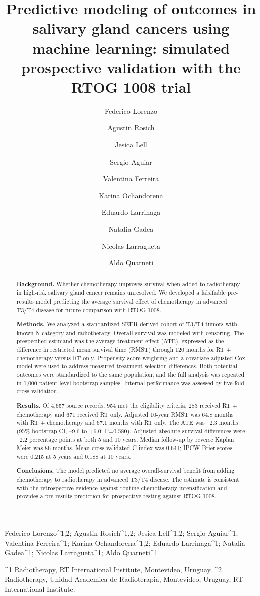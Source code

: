 \documentclass[10pt,twocolumn]{article}
\title{Predictive modeling of outcomes in salivary gland cancers using machine learning: simulated prospective validation with the RTOG 1008 trial}
\author{Federico Lorenzo \and Agustin Rosich \and Jesica Lell \and Sergio Aguiar \and Valentina Ferreira \and Karina Ochandorena \and Eduardo Larrinaga \and Natalia Gadea \and Nicolas Larragueta \and Aldo Quarneti}
\date{}
\begin{document}
\maketitle
Federico Lorenzo\textasciicircum{}1,2; Agustin Rosich\textasciicircum{}1,2; Jesica Lell\textasciicircum{}1,2; Sergio Aguiar\textasciicircum{}1; Valentina Ferreira\textasciicircum{}1; Karina Ochandorena\textasciicircum{}1,2; Eduardo Larrinaga\textasciicircum{}1; Natalia Gadea\textasciicircum{}1; Nicolas Larragueta\textasciicircum{}1; Aldo Quarneti\textasciicircum{}1\par
\textasciicircum{}1 Radiotherapy, RT International Institute, Montevideo, Uruguay. \textasciicircum{}2 Radiotherapy, Unidad Academica de Radioterapia, Montevideo, Uruguay, RT International Institute.\par
\begin{abstract}
\textbf{Background.}
Whether chemotherapy improves survival when added to radiotherapy in high-risk salivary gland cancer remains unresolved. We developed a falsifiable pre-results model predicting the average survival effect of chemotherapy in advanced T3/T4 disease for future comparison with RTOG 1008.\par
\textbf{Methods.}
We analyzed a standardized SEER-derived cohort of T3/T4 tumors with known N category and radiotherapy. Overall survival was modeled with censoring. The prespecified estimand was the average treatment effect (ATE), expressed as the difference in restricted mean survival time (RMST) through 120 months for RT + chemotherapy versus RT only. Propensity-score weighting and a covariate-adjusted Cox model were used to address measured treatment-selection differences. Both potential outcomes were standardized to the same population, and the full analysis was repeated in 1,000 patient-level bootstrap samples. Internal performance was assessed by five-fold cross-validation.\par
\textbf{Results.}
Of 4,657 source records, 954 met the eligibility criteria; 283 received RT + chemotherapy and 671 received RT only. Adjusted 10-year RMST was 64.8 months with RT + chemotherapy and 67.1 months with RT only. The ATE was --2.3 months (95\% bootstrap CI, --9.6 to +6.0; P=0.580). Adjusted absolute survival differences were --2.2 percentage points at both 5 and 10 years. Median follow-up by reverse Kaplan--Meier was 86 months. Mean cross-validated C-index was 0.641; IPCW Brier scores were 0.215 at 5 years and 0.188 at 10 years.\par
\textbf{Conclusions.}
The model predicted no average overall-survival benefit from adding chemotherapy to radiotherapy in advanced T3/T4 disease. The estimate is consistent with the retrospective evidence against routine chemotherapy intensification and provides a pre-results prediction for prospective testing against RTOG 1008.\par
\end{abstract}
\end{document}
